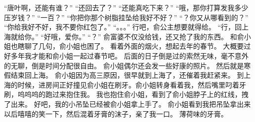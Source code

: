 “唐叶啊，还能有谁？”
“还回去了？”
“还能真吃下来？”
“哦，那你打算发我多少压岁钱？”
“一百？”
“你把你那个树脂挂坠给我好不好？”
“？你又从哪看到的？”
“你给我好不好，我不要你红包了。”
“。。。”
行吧，俞公主想要就得给。
“行，回上海就给你。”
“好哦，爱你。”
“？”
俞富婆不仅没给钱，还又抢了我的东西。
和俞小姐也瞎聊了几句，俞小姐也困了。
看着外面的烟火，想起去年的春节。
大概要过好多年我才能和俞小姐一起过春节吧。
后面的日子倒是过的索然无味，毫不意外的无聊，倒是时间分配很自由。
俞小姐偶尔还会发一些好康的照片。
然后就是寒假结束回上海。
俞小姐因为高三原因，很早就到上海了，还催着我赶紧来。
到上海的时候，进房间正好撞见俞小姐在刷牙。俞小姐转身看着我，然后嘴里叼着牙刷，呜呜呜的跑过来抱住我。
我也抱住俞小姐，看到了俞小姐脖子上的红线，拽了出来。
好吧，我的小吊坠已经被俞小姐拿上手了。
俞小姐看到我把吊坠拿出来以后嘻嘻的笑一下，然后混着牙膏的沫子，亲了我一口。
薄荷味的牙膏。

